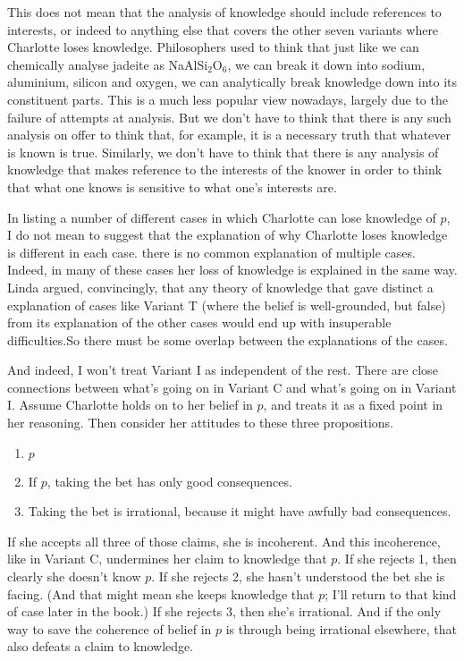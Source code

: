 \documentclass[11pt,]{book}
\providecommand{\tightlist}{%
  \setlength{\itemsep}{0pt}\setlength{\parskip}{0pt}}
\begin{document}
This does not mean that the analysis of knowledge should include references to interests, or indeed to anything else that covers the other seven variants where Charlotte loses knowledge. Philosophers used to think that just like we can chemically analyse jadeite as NaAlSi\(_2\)O\(_6\), we can break it down into sodium, aluminium, silicon and oxygen, we can analytically break knowledge down into its constituent parts. This is a much less popular view nowadays, largely due to the failure of attempts at analysis. But we don't have to think that there is any such analysis on offer to think that, for example, it is a necessary truth that whatever is known is true. Similarly, we don't have to think that there is any analysis of knowledge that makes reference to the interests of the knower in order to think that what one knows is sensitive to what one's interests are.

In listing a number of different cases in which Charlotte can lose knowledge of \(p\), I do not mean to suggest that the explanation of why Charlotte loses knowledge is different in each case. there is no common explanation of multiple cases. Indeed, in many of these cases her loss of knowledge is explained in the same way. Linda \citet{Zagzebski1994} argued, convincingly, that any theory of knowledge that gave distinct a explanation of cases like Variant T (where the belief is well-grounded, but false) from its explanation of the other cases would end up with insuperable difficulties.So there must be some overlap between the explanations of the cases.

And indeed, I won't treat Variant I as independent of the rest. There are close connections between what's going on in Variant C and what's going on in Variant I. Assume Charlotte holds on to her belief in \(p\), and treats it as a fixed point in her reasoning. Then consider her attitudes to these three propositions.

\begin{enumerate}
\def\labelenumi{\arabic{enumi}.}
\tightlist
\item
  \(p\)
\item
  If \(p\), taking the bet has only good consequences.
\item
  Taking the bet is irrational, because it might have awfully bad consequences.
\end{enumerate}

If she accepts all three of those claims, she is incoherent. And this incoherence, like in Variant C, undermines her claim to knowledge that \(p\). If she rejects 1, then clearly she doesn't know \(p\). If she rejects 2, she hasn't understood the bet she is facing. (And that might mean she keeps knowledge that \(p\); I'll return to that kind of case later in the book.) If she rejects 3, then she's irrational. And if the only way to save the coherence of belief in \(p\) is through being irrational elsewhere, that also defeats a claim to knowledge.
\end{document}
